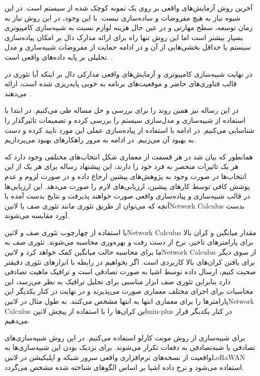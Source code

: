 آخرین روش آزمایش‌های واقعی بر روی یک نمونه کوچک شده از سیستم است.
در این شیوه نیاز به هیچ مفروضات و ساده‌سازی نیست.
با این وجود، در این روش نیاز به زمان توسعه، سطح مهارتی و در عین حال هزینه لوازم نسبت به شبیه‌سازی کامپیوتری بسیار بیشتر است
اما این روش تنها راه برای ارائه مدارک دال بر امکان پیاده‌سازی سیستم یا حداقل بخشی‌هایی از آن و در ادامه حمایت از مفروضات شبیه‌سازی
و مدل تحلیلی بر پایه داده‌های واقعی است.
.

در نهایت شبیه‌سازی کامپیوتری و آزمایش‌های واقعی مدارکی دال بر اینکه آیا تئوری در قالب فناوری‌های حاضر و موقعیت‌های برنامه
به خوبی پایه‌ریزی شده است، ارائه می‌دهند
.

در این رساله نیز همین روند را برای بررسی و حل مساله طی می‌کنیم. در ابتدا با استفاده از شبیه‌سازی و مدل‌سازی سیستم را بررسی کرده
و تصمیمات تاثیرگذار را شناسایی می‌کنیم. در ادامه با استفاده از پیاده‌سازی عملی این مورد تایید کرده و دست به بهبود آن می‌زنیم.
در ادامه به مرور راهکارهای بهبود می‌پردازیم.

همانطور که بیان شد در هر قسمت از معماری شکل  انتخاب‌های مختلفی وجود دارد که هر یک تاثیرات منحصر به فرد خود را دارند،
این پیشنهاد رساله برای هر یک از این انتخاب‌ها در صورت وجود به پژوهش‌های پیشین ارجاع داده و در صورت لزوم و عدم پوشش کافی توسط کارهای پیشین، ارزیابی‌های لازم را صورت می‌دهد.
این ارزیابی‌ها در قالب شبیه‌سازی و پیاده‌سازی واقعی صورت خواهند پذیرفت و نتایج بدست آمده با آنچه که می‌توان از طریق تئوری مانند تئوری صف یا ‌لاتین{Network Calculus}
بدست آورد مقایسه می‌شوند.


با استفاده از چهارچوب تئوری صف و ‌لاتین{Network Calculus} مقدار میانگین و کران بالا برای پارامترهای تاخیر، نرخ از دست رفت
و بهره‌وری محاسبه می‌شوند.
تئوری صف به ما برای محاسبه حالت میانگین کمک خواهد کرد و ‌لاتین{Network Calculus} از سوی دیگر برای یافتن کران‌های بالا کاربردی است.
اگر بخواهیم در رابطه با ابزارهای تئوری دقیقتر صحبت کنیم، ارسال داده توسط اشیا به صورت تصادفی است و ترافیک ماهیت تصادفی دارد بنابراین تئوری صف ابزار مناسبی برای تحلیل ترافیک به نظر می‌رسد،
این محاسبات برای اجزای مختلف معماری صورت می‌پذیرند و در نهایت در کنار یکدیگر این پارامترها را برای
معماری انتها به انتها مشخص می‌کنند.
به طول مثال در ‌لاتین{Network Calculus} این کران‌ها را با استفاده از پیچش ‌لاتین{min-plus} در کنار یکدیگر قرار می‌دهیم.


برای شبیه‌سازی از روش مونت کارلو استفاده می‌کنیم. در این روش شبیه‌سازی‌های تصادفی یا شبه‌تصادفی به دفعات تکرار می‌شوند.
برای نزدیک بودن این شبیه‌سازی‌ها به واقعیت از نسخه‌های نرم‌افزاری واقعی سرور شبکه و اپلیکیشن در ‌لاتین{LoRaWAN} استفاده می‌شود
و نرخ داده اشیا بر اساس الگوهای شناخته شده مشخص می‌گردد.


